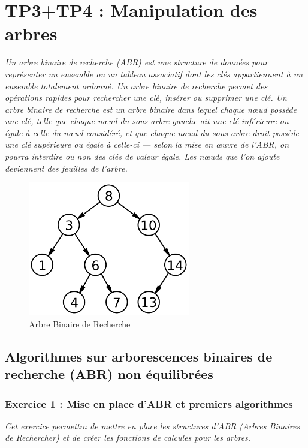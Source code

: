 \chapter{TP3+TP4 : Manipulation des arbres}
\textit{Un arbre binaire de recherche (ABR) est une structure de données pour représenter un ensemble ou un tableau associatif dont les clés appartiennent à un ensemble totalement ordonné. Un arbre binaire de recherche permet des opérations rapides pour rechercher une clé, insérer ou supprimer une clé. Un arbre binaire de recherche est un arbre binaire dans lequel chaque nœud possède une clé, telle que chaque nœud du sous-arbre gauche ait une clé inférieure ou égale à celle du nœud considéré, et que chaque nœud du sous-arbre droit possède une clé supérieure ou égale à celle-ci — selon la mise en œuvre de l'ABR, on pourra interdire ou non des clés de valeur égale. Les nœuds que l'on ajoute deviennent des feuilles de l'arbre.}

\begin{figure}[H]
\centering
\includegraphics[width=200pt]{./cpp/Pictures/tp3+tp4-ABR}
\caption{Arbre Binaire de Recherche}
\label{Arbre Binaire de Recherche}
\end{figure}

\section{Algorithmes sur arborescences binaires de recherche (ABR) non équilibrées}

\subsection{Exercice 1 : Mise en place d’ABR et premiers algorithmes}
\textit{Cet exercice permettra de mettre en place les structures d'ABR (Arbres Binaires de Rechercher) et de créer les fonctions de calcules pour les arbres.}

